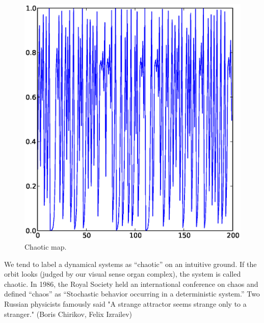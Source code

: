 \documentclass[11pt]{book}
\begin{document}
\begin{figure}[h]
  \begin{center}
    \includegraphics[scale=0.5]{logistic_map_mu4_x02}
  \end{center}
  \caption{
    Chaotic map.
  }
  \label{fig:logistic_map_chaotic}
\end{figure}

We tend to label a dynamical systems as ``chaotic'' on an intuitive ground.
If the orbit looks (judged by our visual sense organ complex), the system is called chaotic.
In 1986, the Royal Society held an international conference on chaos and defined ``chaos'' as ``Stochastic behavior occurring in a deterministic system.'' \cite{stewart}
Two Russian physicists famously said "A strange attractor seems strange only to a stranger."
(Boris Chirikov, Felix Izrailev)\cite{lorenzbook}



\end{document}
